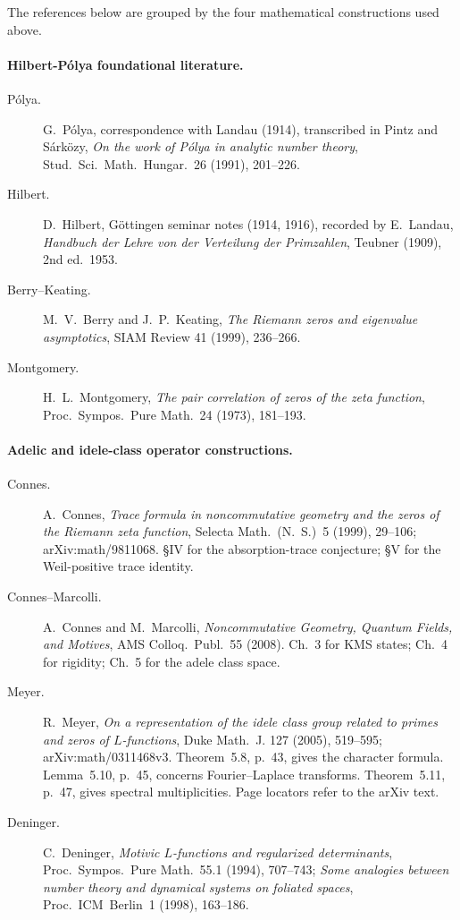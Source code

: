 The references below are grouped by the four mathematical
constructions used above.

\paragraph{Hilbert-P\'olya foundational literature.}
\begin{description}
\item[P\'olya.] G.~P\'olya, correspondence with Landau (1914),
transcribed in Pintz and S\'ark\"ozy, \emph{On the work of P\'olya in
analytic number theory}, Stud.~Sci.~Math.~Hungar.~26 (1991), 201--226.
\item[Hilbert.] D.~Hilbert, G\"ottingen seminar notes (1914, 1916),
recorded by E.~Landau, \emph{Handbuch der Lehre von der Verteilung der
Primzahlen}, Teubner (1909), 2nd ed.~1953.
\item[Berry--Keating.] M.~V.~Berry and J.~P.~Keating, \emph{The
Riemann zeros and eigenvalue asymptotics}, SIAM Review 41 (1999),
236--266.
\item[Montgomery.] H.~L.~Montgomery, \emph{The pair correlation of zeros
of the zeta function}, Proc.~Sympos.~Pure Math.~24 (1973), 181--193.
\end{description}

\paragraph{Adelic and idele-class operator constructions.}
\begin{description}
\item[Connes.] A.~Connes, \emph{Trace formula in noncommutative
geometry and the zeros of the Riemann zeta function}, Selecta
Math.~(N.~S.)~5 (1999), 29--106; arXiv:math/9811068. \S IV for the
absorption-trace conjecture; \S V for the Weil-positive trace
identity.
\item[Connes--Marcolli.] A.~Connes and M.~Marcolli, \emph{Noncommutative
Geometry, Quantum Fields, and Motives}, AMS Colloq.~Publ.~55 (2008).
Ch.~3 for KMS states; Ch.~4 for rigidity; Ch.~5 for the adele class
space.
\item[Meyer.] R.~Meyer, \emph{On a representation of the idele class
group related to primes and zeros of \(L\)-functions}, Duke Math.~J.
127 (2005), 519--595; arXiv:math/0311468v3. Theorem~5.8,
p.~43, gives the character formula. Lemma~5.10, p.~45, concerns
Fourier--Laplace transforms. Theorem~5.11, p.~47, gives spectral
multiplicities. Page locators refer to the arXiv text.
\item[Deninger.] C.~Deninger, \emph{Motivic \(L\)-functions and
regularized determinants}, Proc.~Sympos.~Pure Math.~55.1 (1994),
707--743; \emph{Some analogies between number theory and dynamical
systems on foliated spaces}, Proc.~ICM~Berlin~1 (1998), 163--186.
\end{description}

